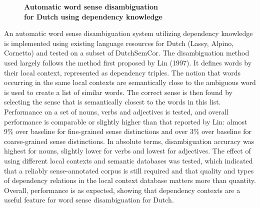\documentclass[10pt, a4paper, twopage, headinclude, footinclude, BCOR5mm]{book}
\begin{document}
\newpage

\begin{figure}[t!]
\centering
\large\textbf{Automatic word sense disambiguation \\ for Dutch using dependency knowledge}
\vspace*{0.5cm}
\end{figure}


\begin{table}[t!]
\end{table} 
\noindent
An automatic word sense disambiguation system utilizing dependency knowledge is implemented using existing language resources for Dutch (Lassy, Alpino, Cornetto) and tested on a subset of DutchSemCor. The disambiguation method used largely follows the method first proposed by Lin (1997). It defines words by their local context, represented as dependency triples. The notion that words occurring in the same local contexts are semantically close to the ambiguous word is used to create a list of similar words. The correct sense is then found by selecting the sense that is semantically closest to the words in this list.   Performance on a set of nouns, verbs and adjectives is tested, and overall performance is comparable or slightly higher than that reported by Lin: almost 9\% over baseline for fine-grained sense distinctions and over 3\% over baseline for coarse-grained sense distinctions. In absolute terms, disambiguation accuracy was highest for nouns, slightly lower for verbs and lowest for adjectives. The effect of using different local contexts and semantic databases was tested, which indicated that a reliably sense-annotated corpus is still required and that quality and types of dependency relations in the local context database matters more than quantity. Overall, performance is as expected, showing that dependency contexts are a useful feature for word sense disambiguation for Dutch.   
\end{document}
